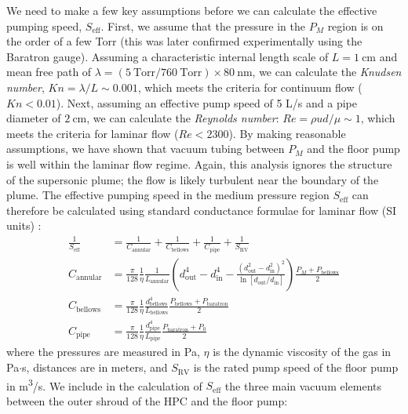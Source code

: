 We need to make a few key assumptions before we can calculate the effective pumping speed, $S_{\textrm{eff}}$. First, we assume that the pressure in the $P_M$ region is on the order of a few Torr (this was later confirmed experimentally using the Baratron gauge). Assuming a characteristic internal length scale of $L = 1 \ \textrm{cm}$ and mean free path of ${\lambda = (5 \ \textrm{Torr}/760 \ \textrm{Torr}) \times 80 \ \textrm{nm}}$, we can calculate the \textit{Knudsen number}, $Kn = \lambda / L \sim 0.001$, which meets the criteria for continuum flow ($Kn < 0.01$). Next, assuming an effective pump speed of 5 L/s and a pipe diameter of $2 \ \textrm{cm}$, we can calculate the \textit{Reynolds number}: $Re = \rho u d / \mu \sim 1$, which meets the criteria for laminar flow ($Re < 2300$). By making reasonable assumptions, we have shown that vacuum tubing between $P_M$ and the floor pump is well within the laminar flow regime. Again, this analysis ignores the structure of the supersonic plume; the flow is likely turbulent near the boundary of the plume. The effective pumping speed in the medium pressure region $S_{\textrm{eff}}$ can therefore be calculated using standard conductance formulae for laminar flow (SI units) \cite{joustenHandbookVacuumTechnology2016}:
\begin{equation}
\begin{aligned}
\frac{1}{S_{\textrm{eff}}} &= \frac{1}{C_{\textrm{annular}}} + \frac{1}{C_{\textrm{bellows}}} + \frac{1}{C_{\textrm{pipe}}} + \frac{1}{S_{\textrm{RV}}} \\
C_{\textrm{annular}} &= \frac{\pi}{128} \frac{1}{\eta} \frac{1}{L_{\textrm{annular}}} \left( d_{\textrm{out}}^4 - d_{\textrm{in}}^4 - \frac{(d_{\textrm{out}}^2 - d_{\textrm{in}}^2)^2}{\ln \left[d_{\textrm{out}}/d_{\textrm{in}}\right]} \right) \frac{P_M + P_{\textrm{bellows}}}{2} \\
C_{\textrm{bellows}} &= \frac{\pi}{128} \frac{1}{\eta} \frac{d_{\textrm{bellows}}^4}{L_{\textrm{bellows}}} \frac{P_{\textrm{bellows}} + P_{\textrm{baratron}}}{2} \\
C_{\textrm{pipe}} &= \frac{\pi}{128} \frac{1}{\eta} \frac{d_{\textrm{pipe}}^4}{L_{\textrm{pipe}}} \frac{P_{\textrm{baratron}} + P_0}{2}
\end{aligned}
\label{eqn:HPC-Seff-equations}
\end{equation}
where the pressures are measured in Pa, $\eta$ is the dynamic viscosity of the gas in Pa$\cdot$s, distances are in meters, and $S_{\textrm{RV}}$ is the rated pump speed of the floor pump in m\textsuperscript{3}/s. We include in the calculation of $S_{\textrm{eff}}$ the three main vacuum elements between the outer shroud of the HPC and the floor pump:
